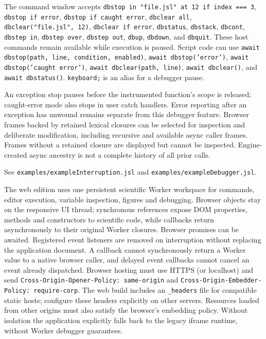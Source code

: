 \documentclass[12pt,a4paper]{article}
\begin{document}
The command window accepts \texttt{dbstop in "file.jsl" at 12 if index === 3}, \texttt{dbstop if error}, \texttt{dbstop if caught error}, \texttt{dbclear all}, \texttt{dbclear("file.jsl", 12)}, \texttt{dbclear if error}, \texttt{dbstatus}, \texttt{dbstack}, \texttt{dbcont}, \texttt{dbstep in}, \texttt{dbstep over}, \texttt{dbstep out}, \texttt{dbup}, \texttt{dbdown}, and \texttt{dbquit}. These host commands remain available while execution is paused. Script code can use \texttt{await dbstop(path, line, condition, enabled)}, \texttt{await dbstop('error')}, \texttt{await dbstop('caught error')}, \texttt{await dbclear(path, line)}, \texttt{await dbclear()}, and \texttt{await dbstatus()}. \texttt{keyboard;} is an alias for a debugger pause.

An exception stop pauses before the instrumented function's scope is released; caught-error mode also stops in user catch handlers. Error reporting after an exception has unwound remains separate from this debugger feature. Browser frames backed by retained lexical closures can be selected for inspection and deliberate modification, including recursive and available async caller frames. Frames without a retained closure are displayed but cannot be inspected. Engine-created async ancestry is not a complete history of all prior calls.

See \texttt{examples/exampleInterruption.jsl} and \texttt{examples/exampleDebugger.jsl}.

The web edition uses one persistent scientific Worker workspace for commands, editor execution, variable inspection, figures and debugging. Browser objects stay on the responsive UI thread; synchronous references expose DOM properties, methods and constructors to scientific code, while callbacks return asynchronously to their original Worker closures. Browser promises can be awaited. Registered event listeners are removed on interruption without replacing the application document. A callback cannot synchronously return a Worker value to a native browser caller, and delayed event callbacks cannot cancel an event already dispatched. Browser hosting must use HTTPS (or localhost) and send \texttt{Cross-Origin-Opener-Policy: same-origin} and \texttt{Cross-Origin-Embedder-Policy: require-corp}. The web build includes an \texttt{\_headers} file for compatible static hosts; configure these headers explicitly on other servers. Resources loaded from other origins must also satisfy the browser's embedding policy. Without isolation the application explicitly falls back to the legacy iframe runtime, without Worker debugger guarantees.
\end{document}
